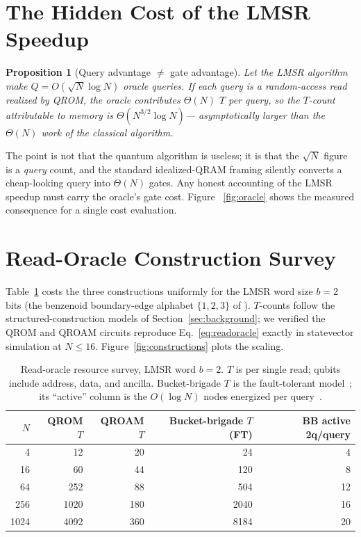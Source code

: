 \documentclass[11pt]{article}
\newtheorem{proposition}{Proposition}
\theoremstyle{definition}
\begin{document}
\section{The Hidden Cost of the LMSR Speedup}
\label{sec:cost}
\begin{proposition}[Query advantage $\neq$ gate advantage]
\label{prop:hidden}
Let the LMSR algorithm make $Q=O(\sqrt{N}\log N)$ oracle queries. If each query is
a random-access read realized by QROM, the oracle contributes $\Theta(N)$ $T$ per
query, so the $T$-count attributable to memory is $\Theta(N^{3/2}\log N)$---%
asymptotically \emph{larger} than the $\Theta(N)$ work of the classical algorithm.
\end{proposition}
\noindent The point is not that the quantum algorithm is useless; it is that the
$\sqrt{N}$ figure is a \emph{query} count, and the standard idealized-QRAM framing
silently converts a cheap-looking query into $\Theta(N)$ gates. Any honest
accounting of the LMSR speedup must carry the oracle's gate cost. Figure~%
\ref{fig:oracle} shows the measured consequence for a single cost evaluation.

\section{Read-Oracle Construction Survey}
\label{sec:survey}
Table~\ref{tab:constructions} costs the three constructions uniformly for the LMSR
word size $b=2$ bits (the benzenoid boundary-edge alphabet $\{1,2,3\}$ of
\cite{pham2025lmsr}). $T$-counts follow the structured-construction models of
Section~\ref{sec:background}; we verified the QROM and QROAM circuits reproduce
Eq.~\eqref{eq:readoracle} exactly in statevector simulation at $N\le16$.
Figure~\ref{fig:constructions} plots the scaling.

\begin{table}[t]
\centering
\caption{Read-oracle resource survey, LMSR word $b=2$. $T$ is per single read;
qubits include address, data, and ancilla. Bucket-brigade $T$ is the
fault-tolerant model~\cite{dimatteo2020faulttolerant}; its ``active'' column is
the $O(\log N)$ nodes energized per query~\cite{giovannetti2008architectures}.}
\label{tab:constructions}
\begin{tabular}{rrrrr}
\toprule
$N$ & QROM $T$ & QROAM $T$ & Bucket-brigade $T$ (FT) & BB active 2q/query \\
\midrule
4    & 12   & 20  & 24   & 4  \\
16   & 60   & 44  & 120  & 8  \\
64   & 252  & 88  & 504  & 12 \\
256  & 1020 & 180 & 2040 & 16 \\
1024 & 4092 & 360 & 8184 & 20 \\
\bottomrule
\end{tabular}
\end{table}
\end{document}
